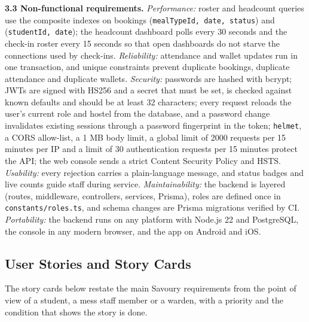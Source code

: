 \documentclass[11pt,a4paper]{article}
\begin{document}
\textbf{3.3 Non-functional requirements.} \emph{Performance:} roster and
headcount queries use the composite indexes on bookings
(\texttt{mealTypeId, date, status}) and (\texttt{studentId, date}); the
headcount dashboard polls every 30 seconds and the check-in roster every 15
seconds so that open dashboards do not starve the connections used by
check-ins. \emph{Reliability:} attendance and wallet updates run in one
transaction, and unique constraints prevent duplicate bookings, duplicate
attendance and duplicate wallets. \emph{Security:} passwords are hashed with
bcrypt; JWTs are signed with HS256 and a secret that must be set, is checked
against known defaults and should be at least 32 characters; every request
reloads the user's current role and hostel from the database, and a password
change invalidates existing sessions through a password fingerprint in the
token; \texttt{helmet}, a CORS allow-list, a 1 MB body limit, a global limit of
2000 requests per 15 minutes per IP and a limit of 30 authentication requests
per 15 minutes protect the API; the web console sends a strict Content Security
Policy and HSTS. \emph{Usability:} every rejection carries a plain-language
message, and status badges and live counts guide staff during service.
\emph{Maintainability:} the backend is layered (routes, middleware, controllers,
services, Prisma), roles are defined once in \texttt{constants/roles.ts}, and
schema changes are Prisma migrations verified by CI. \emph{Portability:} the
backend runs on any platform with Node.js 22 and PostgreSQL, the console in any
modern browser, and the app on Android and iOS.

\subsection{User Stories and Story Cards}

The story cards below restate the main Savoury requirements from the point of
view of a student, a mess staff member or a warden, with a priority and the
condition that shows the story is done.

\newcommand{\storycard}[4]{%
  \begin{tikzpicture}
    \node[card] (c) {\textbf{#1}\hfill\textit{Priority: #2}\\[0.35em]#3\\[0.35em]
      {\footnotesize\textbf{Acceptance:} #4}};
  \end{tikzpicture}}
\end{document}
